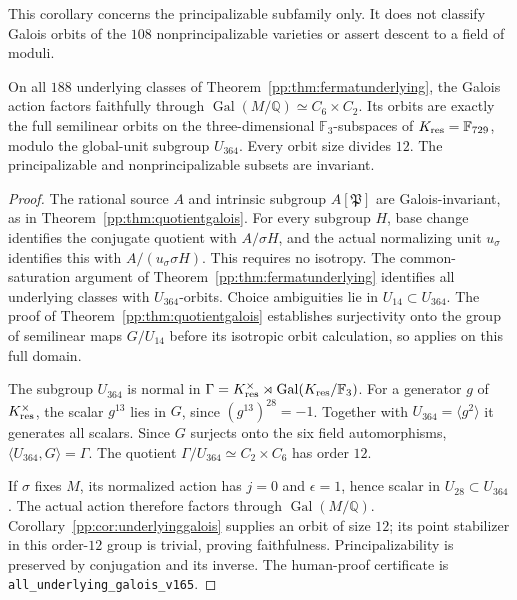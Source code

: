 This corollary concerns the principalizable subfamily only. It does
not classify Galois orbits of the $108$ nonprincipalizable varieties
or assert descent to a field of moduli.


\begin{proposition}
\label{pp:prop:allunderlyinggalois}
On all $188$ underlying classes of
Theorem~\ref{pp:thm:fermatunderlying}, the Galois action factors faithfully
through $\operatorname{Gal}(M/\mathbb Q)\simeq C_6\times C_2$.
Its orbits are exactly the full semilinear orbits on the
three-dimensional $\mathbb F_3$-subspaces of $K_{\rm res}=\mathbb F_{729}$,
modulo the global-unit subgroup $U_{364}$. Every orbit size divides $12$.
The principalizable and nonprincipalizable subsets are invariant.
\end{proposition}
\begin{proof}
The rational source $A$ and intrinsic subgroup $A[\mathfrak P]$ are
Galois-invariant, as in Theorem~\ref{pp:thm:quotientgalois}.
For every subgroup $H$, base change identifies the conjugate quotient
with $A/\sigma H$, and the actual normalizing unit $u_\sigma$ identifies
this with $A/(u_\sigma\sigma H)$. This requires no isotropy.
The common-saturation argument of
Theorem~\ref{pp:thm:fermatunderlying} identifies all underlying classes
with $U_{364}$-orbits. Choice ambiguities lie in $U_{14}\subset U_{364}$.
The proof of Theorem~\ref{pp:thm:quotientgalois} establishes surjectivity
onto the group of semilinear maps $G/U_{14}$ before its isotropic
orbit calculation, so applies on this full domain.

The subgroup $U_{364}$ is normal in
$\Gamma=K_{\rm res}^{\times}\rtimes\operatorname{Gal}(K_{\rm res}/\mathbb F_3)$.
For a generator $g$ of $K_{\rm res}^{\times}$, the scalar $g^{13}$ lies
in $G$, since $(g^{13})^{28}=-1$. Together with
$U_{364}=\langle g^2\rangle$ it generates all scalars.
Since $G$ surjects onto the six field automorphisms,
$\langle U_{364},G\rangle=\Gamma$. The quotient
$\Gamma/U_{364}\simeq C_2\times C_6$ has order $12$.

If $\sigma$ fixes $M$, its normalized action has $j=0$ and
$\epsilon=1$, hence scalar in $U_{28}\subset U_{364}$.
The actual action therefore factors through $\operatorname{Gal}(M/\mathbb Q)$.
Corollary~\ref{pp:cor:underlyinggalois} supplies an orbit of size $12$;
its point stabilizer in this order-$12$ group is trivial, proving
faithfulness. Principalizability is preserved by conjugation and its
inverse. The human-proof certificate is
\texttt{all\_underlying\_galois\_v165}.
\end{proof}

